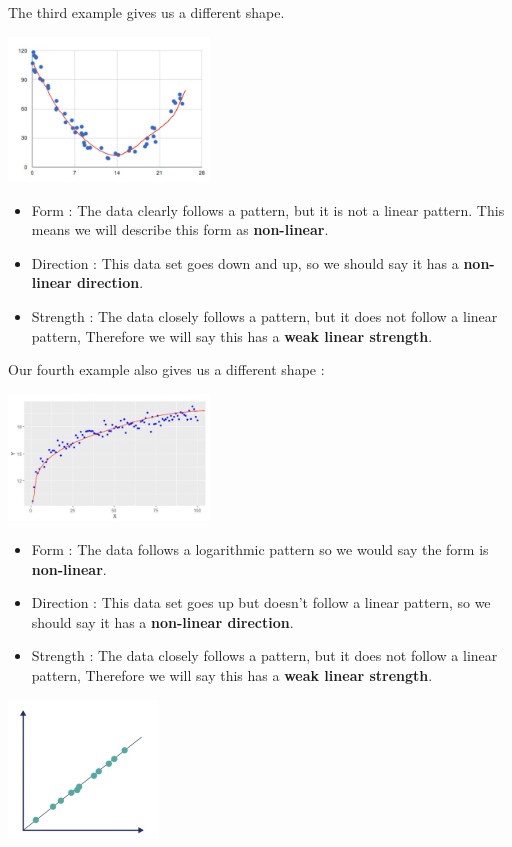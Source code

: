 \documentclass[
  letterpaper,
  DIV=11,
  numbers=noendperiod]{scrreprt}
\providecommand{\tightlist}{%
  \setlength{\itemsep}{0pt}\setlength{\parskip}{0pt}}\usepackage{longtable,booktabs,array}
\begin{document}
The third example gives us a different shape.

\includegraphics[width=0.4\textwidth,height=\textheight]{./images/SC_3.jpg}

\begin{itemize}
\tightlist
\item
  Form : The data clearly follows a pattern, but it is not a linear
  pattern. This means we will describe this form as \textbf{non-linear}.
\item
  Direction : This data set goes down and up, so we should say it has a
  \textbf{non-linear direction}.
\item
  Strength : The data closely follows a pattern, but it does not follow
  a linear pattern, Therefore we will say this has a \textbf{weak linear
  strength}.
\end{itemize}

Our fourth example also gives us a different shape :

\includegraphics[width=0.4\textwidth,height=\textheight]{./images/SC_4.jpg}

\begin{itemize}
\tightlist
\item
  Form : The data follows a logarithmic pattern so we would say the form
  is \textbf{non-linear}.
\item
  Direction : This data set goes up but doesn't follow a linear pattern,
  so we should say it has a \textbf{non-linear direction}.
\item
  Strength : The data closely follows a pattern, but it does not follow
  a linear pattern, Therefore we will say this has a \textbf{weak linear
  strength}.
\end{itemize}

\includegraphics[width=0.3\textwidth,height=\textheight]{./images/SC_5.jpg}
\end{document}
